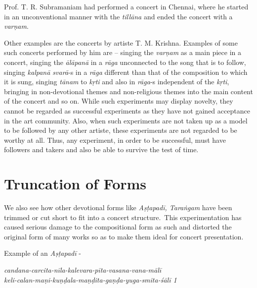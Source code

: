 Prof. T. R. Subramaniam had performed a concert in Chennai, where he started in an unconventional manner with the \textit{tillāna} and ended the concert with a \textit{varṇam}.

Other examples are the concerts by artiste T. M. Krishna. Examples of some such concerts performed by him are – singing the \textit{varṇam} as a main piece in a concert, singing the \textit{ālāpanā} in a \textit{rāga} unconnected to the song that is to follow, singing \textit{kalpanā svarā}-s in a \textit{rāga} different than that of the composition to which it is sung, singing \textit{tānam} to \textit{kṛti} and also in \textit{rāga}-s independent of the \textit{kṛti}, bringing in non-devotional themes and non-religious themes into the main content of the concert and so on. While such experiments may display novelty, they cannot be regarded as successful experiments as they have not gained acceptance in the art community. Also, when such experiments are not taken up as a model to be followed by any other artiste, these experiments are not regarded to be worthy at all. Thus, any experiment, in order to be successful, must have followers and takers and also be able to survive the test of time.

\vspace{-.3cm}


\section*{Truncation of Forms}

We also see how other devotional forms like \textit{Aṣṭapadī, Taraṅgam} have been trimmed or cut short to fit into a concert structure.~This experimentation has caused serious damage to the compositional form as such and distorted the original form of many works so as to make them ideal for concert presentation.

Example of an \textit{Aṣṭapadī} -

\begin{myquote}
\textit{candana-carcita-nīla-kalevara-pīta-vasana-vana-mālī }\\ \textit{keli-calan-maṇi-kuṇḍala-maṇḍita-gaṇḍa-yuga-smita-śālī 1 }
\end{myquote}

